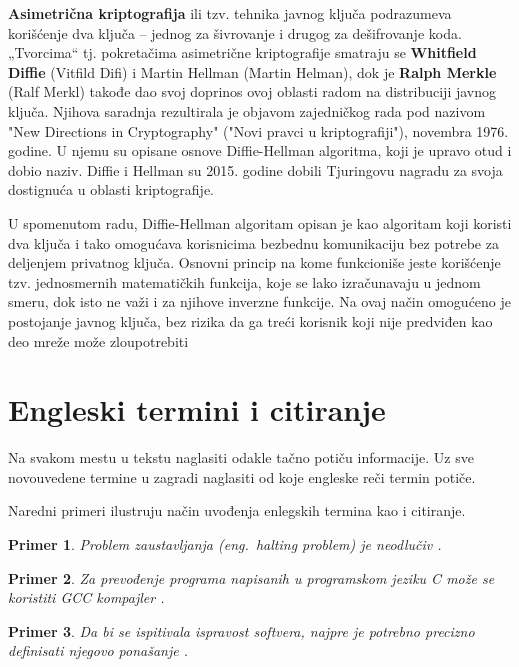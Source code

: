 \documentclass[a4paper]{article}
\newtheorem{primer}{Primer}[subsection]
\begin{document}
{\textbf{Asimetrična kriptografija} ili tzv. tehnika javnog ključa podrazumeva korišćenje dva ključa – jednog za šivrovanje i drugog za dešifrovanje koda. „Tvorcima“ tj. pokretačima asimetrične kriptografije smatraju se \textbf{Whitfield Diffie} (Vitfild Difi) i Martin Hellman (Martin Helman), dok je \textbf{Ralph Merkle} (Ralf Merkl) takođe dao svoj doprinos ovoj oblasti radom na distribuciji javnog ključa. Njihova saradnja rezultirala je objavom zajedničkog rada pod nazivom "New Directions in Cryptography" ("Novi pravci u kriptografiji"), novembra 1976. godine. U njemu su opisane osnove Diffie-Hellman algoritma, koji je upravo otud i dobio naziv. Diffie i Hellman su 2015. godine dobili Tjuringovu nagradu za svoja dostignuća u oblasti kriptografije. 

U spomenutom radu, Diffie-Hellman algoritam opisan je kao algoritam koji koristi dva ključa i tako omogućava korisnicima bezbednu komunikaciju bez potrebe za deljenjem privatnog ključa. Osnovni princip na kome funkcioniše jeste korišćenje tzv. jednosmernih matematičkih funkcija, koje se lako izračunavaju u jednom smeru, dok isto ne važi i za njihove inverzne funkcije. Na ovaj način omogućeno je postojanje javnog ključa, bez rizika da ga treći korisnik koji nije predviđen kao deo mreže može zloupotrebiti



\section{Engleski termini i citiranje}	
\label{sec:termini_i_citiranje}

Na svakom mestu u tekstu naglasiti odakle tačno potiču informacije. Uz sve novouvedene termine u zagradi naglasiti od koje engleske reči termin potiče. 

Naredni primeri ilustruju način uvođenja enlegskih termina kao i citiranje.

\begin{primer}
Problem zaustavljanja (eng.~{\em halting problem}) je neodlučiv \cite{haltingproblem}.
\end{primer}

\begin{primer}
Za prevođenje programa napisanih u programskom jeziku C može se koristiti GCC kompajler \cite{gcc}.
\end{primer}

\begin{primer}
 Da bi se ispitivala ispravost softvera, najpre je potrebno precizno definisati njegovo ponašanje \cite{laski2009software}. 
\end{primer}

}
\end{document}
